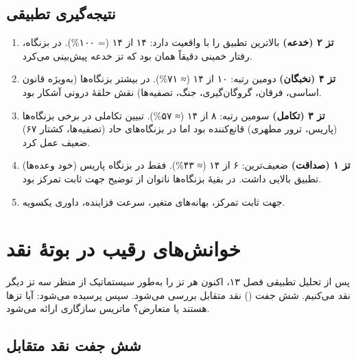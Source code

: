 \section{نتیجه‌گیری تطبیقی}

\begin{principleBox}
\begin{enumerate}[label=\textcolor{cPrimary}{\bfseries\arabic*.}, rightmargin=2em]
    \item \textbf{تز ۲ (خدعه)} بالاترین تطبیق را با واقعیت دارد: ۱۴ از ۱۴ (= ۱۰۰\%). در  بزنگاه، رفتار خمینی دقیقاً همان بود که تز خدعه پیش‌بینی می‌کرد.
    \item \textbf{تز ۴ (نخبگان)} دومین رتبه: ۱۰ از ۱۴ (≈ ۷۱\%). در بیشتر بزنگاه‌ها (به‌ویژه قانون اساسی، فرقان، گروگان‌گیری، جنگ، تصفیه‌ها) نقش حلقهٔ درونی آشکار بود.
    \item \textbf{تز ۳ (تکامل)} سومین رتبه: ۸ از ۱۴ (≈ ۵۷\%). تبیین تکاملی در برخی بزنگاه‌ها (پاریس، ترور مطهری) قانع‌کننده بود اما در بزنگاه‌های حاد (تصفیه‌ها، کشتار ۶۷) ضعیف عمل کرد.
    \item \textbf{تز ۱ (صداقت)} ضعیف‌ترین: ۶ از ۱۴ (≈ ۴۳\%). فقط در بزنگاه پاریس (خود وعده‌ها) تطبیق بالایی داشت. در بقیهٔ بزنگاه‌ها ناتوان از توضیح جهت ثابت تمرکز بود.
    \item {} جهت ثابت تمرکز، بهانه‌های متغیر، سرعت فزاینده، داوری یکسویه.
\end{enumerate}
\end{principleBox}


\chapter{خوانش‌های رقیب در بوتهٔ نقد}

\begin{infoBox}
پس از تحلیل تطبیقی فصل ۱۳، اکنون هر تز را به‌طور سیستماتیک از منظر سه تز دیگر نقد می‌کنیم. شش جفت () نقد متقابل بررسی می‌شود. سپس پرسیده می‌شود: آیا تزها  هستند یا متعارض؟ ماتریس سازگاری ارائه می‌شود.
\end{infoBox}

\section{شش جفت نقد متقابل}

